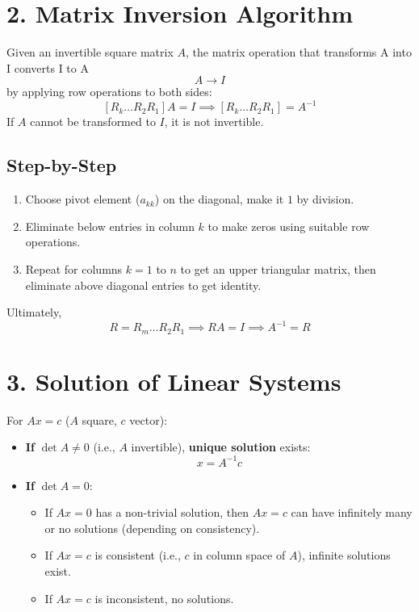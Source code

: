 \documentclass[12pt, a4paper]{report}
\begin{document}
\section*{2. Matrix Inversion Algorithm}

Given an invertible square matrix $A$, the matrix operation that transforms A into I converts I to A
\[
A \to I
\]
by applying row operations to both sides:
\[
[R_k \ldots R_2 R_1]A = I \implies [R_k \ldots R_2 R_1] = A^{-1}
\]
If $A$ cannot be transformed to $I$, it is not invertible.

\subsection*{Step-by-Step}
\begin{enumerate}
    \item Choose pivot element ($a_{kk}$) on the diagonal, make it $1$ by division.
    \item Eliminate below entries in column $k$ to make zeros using suitable row operations.
    \item Repeat for columns $k=1$ to $n$ to get an upper triangular matrix, then eliminate above diagonal entries to get identity.
\end{enumerate}
Ultimately,
\[
R = R_m \dots R_2 R_1 \implies R A = I \implies A^{-1} = R
\]

\section*{3. Solution of Linear Systems}

For $A x = c$ ($A$ square, $c$ vector):
\begin{itemize}
    \item \textbf{If} $\det A \neq 0$ (i.e., $A$ invertible), \textbf{unique solution} exists:
    \[
    x = A^{-1} c
    \]
    \item \textbf{If} $\det A = 0$:
    \begin{itemize}
        \item If $A x = 0$ has a non-trivial solution, then $A x = c$ can have infinitely many or no solutions (depending on consistency).
        \item If $A x = c$ is consistent (i.e., $c$ in column space of $A$), infinite solutions exist.
        \item If $A x = c$ is inconsistent, no solutions.
    \end{itemize}
\end{itemize}
\end{document}
